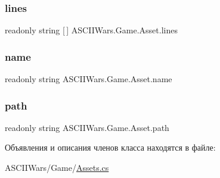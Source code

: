 \subsubsection{\texorpdfstring{lines}{lines}}
{\footnotesize\ttfamily readonly string \mbox{[}$\,$\mbox{]} A\+S\+C\+I\+I\+Wars.\+Game.\+Asset.\+lines}

\hypertarget{class_a_s_c_i_i_wars_1_1_game_1_1_asset_a5bd9f716708c7943bdd313357da7d7f3}{}\label{class_a_s_c_i_i_wars_1_1_game_1_1_asset_a5bd9f716708c7943bdd313357da7d7f3} 
\subsubsection{\texorpdfstring{name}{name}}
{\footnotesize\ttfamily readonly string A\+S\+C\+I\+I\+Wars.\+Game.\+Asset.\+name}

\hypertarget{class_a_s_c_i_i_wars_1_1_game_1_1_asset_a2d1d00016592f2930725bf14a2a05fb8}{}\label{class_a_s_c_i_i_wars_1_1_game_1_1_asset_a2d1d00016592f2930725bf14a2a05fb8} 
\subsubsection{\texorpdfstring{path}{path}}
{\footnotesize\ttfamily readonly string A\+S\+C\+I\+I\+Wars.\+Game.\+Asset.\+path}



Объявления и описания членов класса находятся в файле\+:\begin{DoxyCompactItemize}
\item 
A\+S\+C\+I\+I\+Wars/\+Game/\hyperlink{_assets_8cs}{Assets.\+cs}\end{DoxyCompactItemize}
